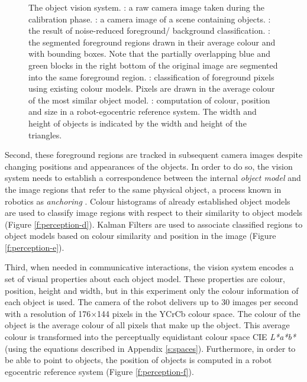 \begin{figure}[htbp]
{    \label{f:perception-e}
  }
  \caption[The object vision system]{The object vision
    system. : a raw camera image taken during
    the calibration phase. : a camera image of
    a scene containing objects. : the result of
    noise-reduced foreground/ background
    classification. : the segmented foreground
    regions drawn in their average colour and with bounding
    boxes. Note that the partially overlapping blue and green blocks
    in the right bottom of the original image are segmented into the
    same foreground region. : classification of
    foreground pixels using existing colour models. Pixels are drawn
    in the average colour of the most similar object
    model. : computation of colour, position
    and size in a robot-egocentric reference system. The width and
    height of objects is indicated by the width and height of the
    triangles.}
  \label{f:object-perception}
\end{figure}

Second, these foreground regions are tracked in subsequent camera
images despite changing positions and appearances of the objects. In
order to do so, the vision system needs to establish a correspondence
between the internal \emph{object model} and the image regions that
refer to the same physical object, a process known in robotics as
\emph{anchoring} \citep{coradeschi03anchoring}. Colour histograms of
already established object models are used to classify image regions
with respect to their similarity to object models (Figure
\ref{f:perception-d}). Kalman Filters \citep{kalman60new} are used to
associate classified regions to object models based on colour
similarity and position in the image (Figure \ref{f:perception-e}).

Third, when needed in communicative interactions, the vision system
encodes a set of visual properties about each object model. These
properties are colour, position, height and width, but in this
experiment only the colour information of each object is used. The
camera of the robot delivers up to 30 images per second with a
resolution of 176$\times$144 pixels in the YCrCb colour space. The
colour of the object is the average colour of all pixels that make up
the object. This average colour is transformed into the perceptually
equidistant colour space CIE \emph{L*a*b*} (using the equations
described in Appendix \ref{s:spaces}). Furthermore, in order to be able
to point to objects, the position of objects is computed in a robot
egocentric reference system (Figure \ref{f:perception-f}).

